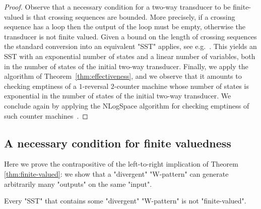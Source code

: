 \documentclass{theoretics}
\begin{document}
    \begin{proof}
      Observe that a necessary condition for a two-way transducer to
      be finite-valued is that crossing sequences are bounded.
      More precisely, if a crossing sequence has a loop then the
      output of the loop must be empty, otherwise the transducer is
      not finite valued.
      Given a bound on the length of crossing sequences the standard
      conversion into an equivalent "SST" applies, see
      e.g.~\cite{ledent13,DBLP:journals/ijfcs/DartoisJR18}. This
      yields an SST with an exponential number of states and a linear
      number of variables, both in the number of
      states of the initial two-way
      transducer. Finally, we apply the algorithm of
      Theorem~\ref{thm:effectiveness}, and we observe that it amounts
      to checking emptiness of a $1$-reversal $2$-counter machine
      whose number of states is exponential in the number of states of
      the initial two-way transducer. We  conclude again by applying the
      {\upshape\sc NLogSpace} algorithm for checking emptiness of such
      counter machines~\cite{DBLP:journals/jcss/GurariI81}. 
    \end{proof}



\subsection{A necessary condition for finite valuedness}\label{subsec:left-to-right}

Here we prove the contrapositive of the left-to-right
implication of Theorem \ref{thm:finite-valued}:
we show that a
"divergent" "W-pattern" can generate arbitrarily
many "outputs" on the same "input".

\begin{lemma}\label{lem:unbounded-values1}
Every "SST" that contains some "divergent" "W-pattern" is not "finite-valued".
\end{lemma}
\end{document}
